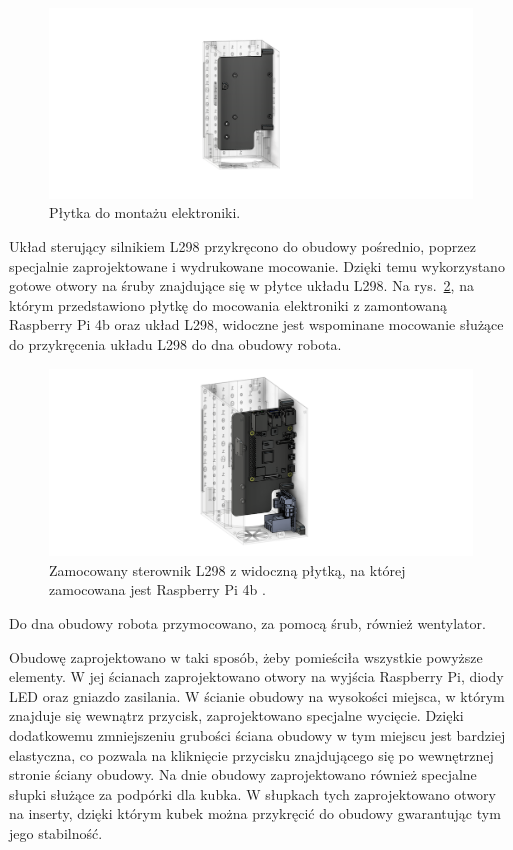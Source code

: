 \begin{figure}[H]
    \centering
    \includegraphics[width=0.95\linewidth]{chapters/03-praca-wlasna/figures/main_board}
    \caption{\label{fig:mainboard}Płytka do montażu elektroniki.}
\end{figure}

Układ sterujący silnikiem L298 przykręcono do obudowy pośrednio, poprzez specjalnie zaprojektowane i wydrukowane mocowanie. Dzięki temu wykorzystano
gotowe otwory na śruby znajdujące się w płytce układu L298. Na rys.~\ref{fig:steownik}, na którym przedstawiono płytkę do mocowania elektroniki
z zamontowaną Raspberry Pi 4b oraz układ L298, widoczne jest wspominane mocowanie służące do przykręcenia układu L298 do dna obudowy robota.

\begin{figure}[H]
    \centering
    \includegraphics[width=0.95\linewidth]{chapters/03-praca-wlasna/figures/l298n}
    \caption{\label{fig:steownik}Zamocowany sterownik L298 \cite{L298n3d} z widoczną płytką, na której zamocowana jest Raspberry Pi 4b \cite{malina3d}.}
\end{figure}

Do dna obudowy robota przymocowano, za pomocą śrub, również wentylator.

Obudowę zaprojektowano w taki sposób, żeby pomieściła wszystkie powyższe elementy. W jej ścianach zaprojektowano otwory na wyjścia Raspberry Pi,
diody LED oraz gniazdo zasilania. W ścianie obudowy na wysokości miejsca, w którym znajduje się wewnątrz przycisk, zaprojektowano specjalne wycięcie.
Dzięki dodatkowemu zmniejszeniu grubości ściana obudowy w tym miejscu jest bardziej elastyczna, co pozwala na kliknięcie przycisku znajdującego
się po wewnętrznej stronie ściany obudowy. Na dnie obudowy zaprojektowano również specjalne słupki służące za podpórki dla kubka.
W słupkach tych zaprojektowano otwory na inserty, dzięki którym kubek można przykręcić do obudowy gwarantując tym jego stabilność.

